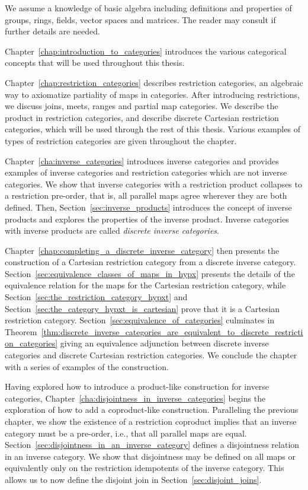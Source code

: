 We assume a knowledge of basic algebra including definitions and properties of groups, rings,
fields, vector spaces and matrices. The reader may consult \cite{lang:algebra} if further details
are needed.

Chapter~\ref{chap:introduction_to_categories} introduces the various categorical concepts that will
be used throughout this thesis.

Chapter~\ref{chap:restriction_categories} describes restriction categories, an algebraic way to
axiomatize partiality of maps in categories. After introducing restrictions, we discuss joins,
meets, ranges and partial map categories. We describe the product in restriction categories, and
describe discrete Cartesian restriction categories, which will be used through the rest of this
thesis. Various examples of types of restriction categories are given throughout the chapter.


Chapter~\ref{cha:inverse_categories} introduces inverse categories and provides examples of inverse
categories and restriction categories which are not inverse categories. We show that inverse categories with a restriction
product collapses to a restriction pre-order, that is, all parallel maps agree wherever they are
both defined. Then, Section~\ref{sec:inverse_products} introduces the concept of inverse products and
explores the properties of the inverse product. Inverse categories with
inverse products are called \emph{discrete inverse categories}.

Chapter~\ref{chap:completing_a_discrete_inverse_category} then presents the construction of a
Cartesian restriction category from a discrete inverse category.
Section~\ref{sec:equivalence_classes_of_maps_in_hypx} presents the details of the equivalence
relation for the maps for the Cartesian restriction category, while
Section~\ref{sec:the_restriction_category_hypxt} and
Section~\ref{sec:the_category_hypxt_is_cartesian} prove that it is a Cartesian restriction
category. Section~\ref{sec:equivalence_of_categories} culminates in
Theorem~\ref{thm:discrete_inverse_categories_are_equivalent_to_discrete_restriction_categories}
giving an equivalence adjunction between discrete inverse categories and discrete Cartesian
restriction categories. We conclude the chapter with a series of examples of the construction.

Having explored how to introduce a product-like construction for inverse categories,
Chapter~\ref{cha:disjointness_in_inverse_categories} begins the exploration of how to add a
coproduct-like construction. Paralleling the previous chapter, we show the existence of a restriction
coproduct implies that an inverse category must be a pre-order, i.e., that all parallel maps are
equal. Section~\ref{sec:disjointness_in_an_inverse_category} defines a disjointness relation in an inverse category. We show
that disjointness may be defined on all maps or equivalently only on the restriction idempotents of
the inverse category. This allows us to now define the disjoint join in
Section~\ref{sec:disjoint_joins}.

